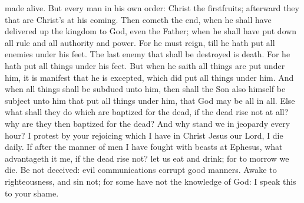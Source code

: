 made alive.  But every man in his own order: Christ the
firstfruits; afterward they that are Christ's at his coming.
 Then cometh the end, when he shall have delivered up the
kingdom to God, even the Father; when he shall have put down all rule
and all authority and power.  For he must reign, till he
hath put all enemies under his feet.  The last enemy that
shall be destroyed is death.  For he hath put all things
under his feet. But when he saith all things are put under him, it is
manifest that he is excepted, which did put all things under him.
 And when all things shall be subdued unto him, then shall
the Son also himself be subject unto him that put all things under him,
that God may be all in all.  Else what shall they do which
are baptized for the dead, if the dead rise not at all? why are they
then baptized for the dead?  And why stand we in jeopardy
every hour?  I protest by your rejoicing which I have in
Christ Jesus our Lord, I die daily.  If after the manner of
men I have fought with beasts at Ephesus, what advantageth it me, if the
dead rise not? let us eat and drink; for to morrow we die. 
Be not deceived: evil communications corrupt good manners. 
Awake to righteousness, and sin not; for some have not the knowledge of
God: I speak this to your shame.

